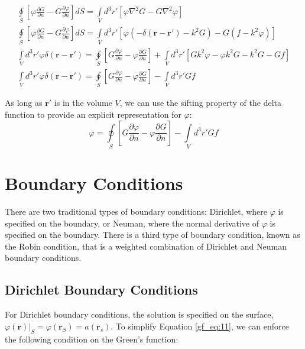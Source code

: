 \begin{equation}
\begin{gathered}
\oint\limits_{S} \left[ \varphi\frac{\partial G}{\partial n} - G\frac{\partial \varphi}{\partial n} \right]dS = \int\limits_{V}d^3r' \left[ \varphi\nabla^2G- G \nabla^2 \varphi\right] \\
\oint\limits_{S} \left[ \varphi\frac{\partial G}{\partial n} - G\frac{\partial \varphi}{\partial n} \right]dS = \int\limits_{V}d^3r' \left[ \varphi \left(-\delta\left(\mathbf{r}-\mathbf{r}' \right) - k^2G\right)- G \left(f - k^2\varphi \right)\right] \\
\int\limits_{V}d^3r'\varphi\delta\left(\mathbf{r}-\mathbf{r}' \right) = \oint\limits_{S}\left[G\frac{\partial \varphi}{\partial n} - \varphi\frac{\partial G}{\partial n} \right] +\int\limits_{V}d^3r'\left[ Gk^2\varphi - \varphi k^2G-k^2G - Gf \right] \\
\int\limits_{V}d^3r'\varphi\delta\left(\mathbf{r}-\mathbf{r}' \right) = \oint\limits_{S}\left[G\frac{\partial \varphi}{\partial n} - \varphi\frac{\partial G}{\partial n} \right] -\int\limits_{V}d^3r' Gf
\end{gathered}
\label{gf_eq:10}
\end{equation}
\renewcommand{\baselinestretch}{2} \small\normalsize

As long as $\mathbf{r}'$ is in the volume $V$, we can use the sifting property of the delta function to provide an explicit representation for $\varphi$:
\begin{equation}
\boxed{\varphi = \oint\limits_{S}\left[G\frac{\partial \varphi}{\partial n} - \varphi\frac{\partial G}{\partial n} \right] -\int\limits_{V}d^3r' Gf}
\label{gf_eq:11}
\end{equation}
\renewcommand{\baselinestretch}{2} \small\normalsize

\section{Boundary Conditions}
There are two traditional types of boundary conditions: Dirichlet, where $\varphi$ is specified on the boundary, or Neuman, where the normal derivative of $\varphi$ is specified on the boundary. There is a third type of boundary condition, known as the Robin condition, that is a weighted combination of Dirichlet and Neuman boundary conditions.

\subsection{Dirichlet Boundary Conditions}
For Dirichlet boundary conditions, the solution is specified on the surface, $\varphi\left(\mathbf{r}\right) |_{S} = \varphi\left(\mathbf{r}_S \right) = a\left(\mathbf{r}_s\right)$. To simplify Equation \ref{gf_eq:11}, we can enforce the following condition on the Green's function:

